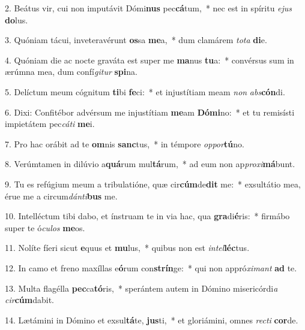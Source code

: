 2. Beátus vir, cui non imputávit Dómi\textbf{nus} pec\textbf{cá}tum,~*  nec est in spíritu \textit{e}\textit{jus} \textbf{do}lus.\

3. Quóniam tácui, inveteravérunt \textbf{os}sa \textbf{me}a,~*  dum clamárem \textit{to}\textit{ta} \textbf{di}e.\

4. Quóniam die ac nocte graváta est super me \textbf{ma}nus \textbf{tu}a:~*  convérsus sum in ærúmna mea, dum confí\textit{gi}\textit{tur} \textbf{spi}na.\

5. Delíctum meum cógnitum \textbf{ti}bi \textbf{fe}ci:~*  et injustítiam meam \textit{non} \textit{abs}\textbf{cón}di.\

6. Dixi: Confitébor advérsum me injustítiam \textbf{me}am \textbf{Dó}\textbf{mi}no:~*  et tu remisísti impietátem pec\textit{cá}\textit{ti} \textbf{me}i.\

7. Pro hac orábit ad te \textbf{om}nis \textbf{sanc}tus,~*  in témpore \textit{op}\textit{por}\textbf{tú}no.\

8. Verúmtamen in dilúvio a\textbf{quá}rum mul\textbf{tá}rum,~*  ad eum non ap\textit{pro}\textit{xi}\textbf{má}bunt.\

9. Tu es refúgium meum a tribulatióne, quæ cir\textbf{cúm}de\textbf{dit} me:~*  exsultátio mea, érue me a circum\textit{dán}\textit{ti}\textbf{bus} me.\

10. Intelléctum tibi dabo, et ínstruam te in via hac, qua \textbf{gra}di\textbf{é}ris:~*  firmábo super te ó\textit{cu}\textit{los} \textbf{me}os.\

11. Nolíte fíeri sicut \textbf{e}quus et \textbf{mu}lus,~*  quibus non est \textit{in}\textit{tel}\textbf{léc}tus.\

12. In camo et freno maxíllas e\textbf{ó}rum con\textbf{strín}ge:~*  qui non appró\textit{xi}\textit{mant} \textbf{ad} te.\

13. Multa flagélla \textbf{pec}ca\textbf{tó}ris,~*  sperántem autem in Dómino misericórdi\textit{a} \textit{cir}\textbf{cúm}dabit.\

14. Lætámini in Dómino et exsul\textbf{tá}te, \textbf{jus}ti,~*  et gloriámini, omnes \textit{rec}\textit{ti} \textbf{cor}de.\

